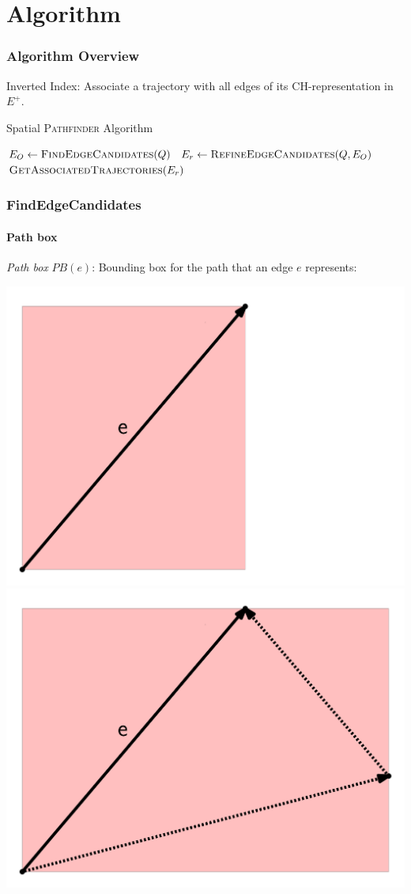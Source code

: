 \documentclass{beamer}
\newcommand{\pathfinder}{\textsc{Pathfinder}\xspace}
\newcommand{\findEdgeCandidates}{FindEdgeCandidates\xspace}
\newcommand{\refineEdgeCandidates}{RefineEdgeCandidates\xspace}
\newcommand{\getAssociatedTrajectories}{GetAssociatedTrajectories\xspace}
\newcommand{\chrep}{CH-representation\xspace}
\begin{document}
\section{Algorithm}

\begin{frame}
	\frametitle{Algorithm Overview}
	Inverted Index: Associate a trajectory with all edges of its \chrep in $E^+$. \pause
	\begin{algorithm}[H]
		\renewcommand{\thealgorithm}{}
		{\small
			\caption{Spatial \pathfinder Algorithm}
			\begin{algorithmic}[1]
				 \pause
				\State $E_O \gets \Call{\findEdgeCandidates}{Q}$ \label{line:edge_revrieval} \pause
				\State $E_r \gets \Call{\refineEdgeCandidates}{Q, E_O}$ \pause
				\State \Return $\Call{\getAssociatedTrajectories}{E_r}$
				\EndProcedure
			\end{algorithmic}
			\label{alg:spatial_pathfinder}
		}
	\end{algorithm}
\end{frame}

\begin{frame}
	\frametitle{\findEdgeCandidates}
	\framesubtitle{Path box}
	\emph{Path box} $PB(e)$: Bounding box for the path that an edge $e$ represents:

	\includegraphics[width=.45\columnwidth]{images/simplePathBox} \pause
	\includegraphics[width=.45\columnwidth]{images/pathBox}
\end{frame}
\end{document}
